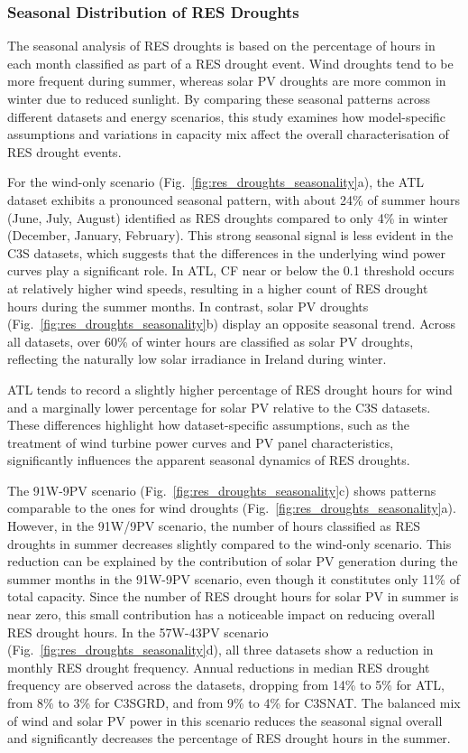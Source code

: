 \documentclass[preprint, 12pt]{elsarticle}
\providecommand{\DIFadd}[1]{{\protect\color{blue}\uwave{#1}}} %
\providecommand{\DIFaddbegin}{} %
\providecommand{\DIFaddend}{} %
\begin{document}
\subsubsection{Seasonal Distribution of RES Droughts}

The seasonal analysis of RES droughts is based on the percentage of hours in each month classified as part of a RES drought event. Wind droughts tend to be more frequent during summer, whereas solar PV droughts are more common in winter due to reduced sunlight. By comparing these seasonal patterns across different datasets and energy scenarios, this study examines how model-specific assumptions and variations in capacity mix affect the overall characterisation of RES drought events.

For the wind-only scenario (Fig.~\ref{fig:res_droughts_seasonality}a), the ATL dataset exhibits a pronounced seasonal pattern, with about 24\% of summer hours (June, July, August) identified as RES droughts compared to only 4\% in winter (December, January, February). This strong seasonal signal is less evident in the C3S datasets, which suggests that the differences in the underlying wind power curves play a significant role. In ATL, CF near or below the 0.1 threshold occurs at relatively higher wind speeds, resulting in a higher count of RES drought hours during the summer months. In contrast, solar PV droughts (Fig.~\ref{fig:res_droughts_seasonality}b) display an opposite seasonal trend. Across all datasets, over 60\% of winter hours are classified as solar PV droughts, reflecting the naturally low solar irradiance in Ireland during winter. 

ATL tends to record a slightly higher percentage of RES drought hours for wind and a marginally lower percentage for solar PV relative to the C3S datasets. These differences highlight how dataset-specific assumptions, such as the treatment of wind turbine power curves and PV panel characteristics, significantly influences the apparent seasonal dynamics of RES droughts.

The 91W-9PV scenario (Fig.~\ref{fig:res_droughts_seasonality}c) shows patterns comparable to the ones for wind droughts (Fig.~\ref{fig:res_droughts_seasonality}a). However, in the 91W/9PV scenario, the number of hours classified as RES droughts in summer decreases slightly compared to the wind-only scenario. This reduction can be explained by the contribution of solar PV generation during the summer months in the 91W-9PV scenario, even though it constitutes only 11\% of total capacity. Since the number of RES drought hours for solar PV in summer is near zero, this small contribution has a noticeable impact on reducing overall RES drought hours. In the 57W-43PV scenario (Fig.~\ref{fig:res_droughts_seasonality}d), all three datasets show a reduction in monthly RES drought frequency. Annual reductions in median RES drought frequency are observed across the datasets, dropping from 14\% to 5\% for ATL, from 8\% to 3\% for C3S\DIFaddbegin \DIFadd{~}\DIFaddend GRD, and from 9\% to 4\% for C3S\DIFaddbegin \DIFadd{~}\DIFaddend NAT. The balanced mix of wind and solar PV power in this scenario reduces the seasonal signal overall and significantly decreases the percentage of RES drought hours in the summer.
\end{document}
